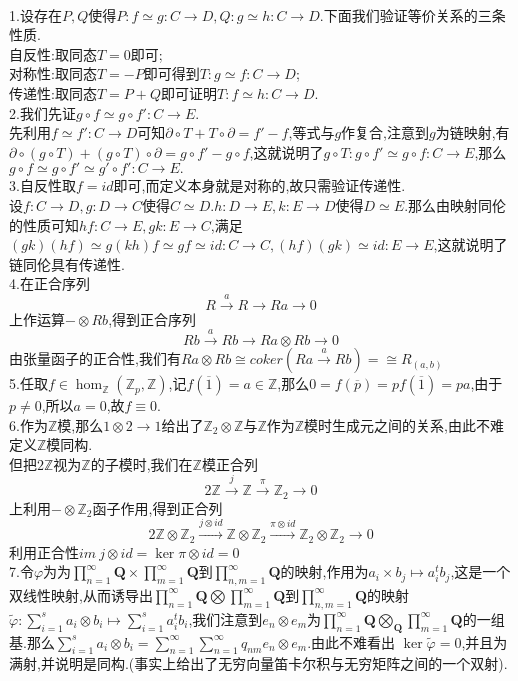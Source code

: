 \documentclass[a4paper]{ctexart}
\newcommand{\ts}[2]{#1\otimes #2}
\newcommand{\es}[5]{#1\xrightarrow{#2}#3\xrightarrow{#4}#5\xrightarrow{}0}
\begin{document}
\pagestyle{plain}
\noindent
{}
\\
1.设存在$P,Q$使得$P:f\simeq g:C\to D,Q:g\simeq h :C\to D$.下面我们验证等价关系的三条性质.\\
自反性:取同态$T=0$即可;\\
对称性:取同态$T=-P$即可得到$T:g\simeq f:C\to D$;\\
传递性:取同态$T=P+Q$即可证明$T:f\simeq h:C\to D$.\\
2.我们先证$g\circ f\simeq g\circ f':C\to E$.\\
先利用$f\simeq f':C\to D$可知$\partial \circ T+T\circ\partial=f'-f$,等式与$g$作复合,注意到$g$为链映射,有$\partial \circ (g\circ T)+(g\circ T)\circ\partial=g\circ f'-g\circ f$,这就说明了$g\circ T:g\circ f'\simeq g\circ f:C\to E$,那么$g\circ f\simeq g\circ f'\simeq g'\circ f':C\to E.$\\
3.自反性取$f=id$即可,而定义本身就是对称的,故只需验证传递性.\\
设$f:C\to D,g: D\to C$使得$C\simeq D$.$h:D\to E,k:E\to D$使得$D\simeq E$.那么由映射同伦的性质可知$hf:C\to E,gk:E\to C$,满足$(gk)(hf)\simeq g(kh)f\simeq gf\simeq id:C\to C,(hf)(gk)\simeq id:E\to E$,这就说明了链同伦具有传递性.\\
4.在正合序列
\[\es{R}{a}{R}{}{Ra}\]
上作运算$-\otimes Rb$,得到正合序列
\[\es{Rb}{a}{Rb}{}{Ra\otimes Rb}\]
由张量函子的正合性,我们有$Ra\otimes Rb\cong coker(Ra\xrightarrow{a}Rb)=\cong R_{(a,b)}$\\
5.任取$f\in \hom_{\mathbb{Z}}(\mathbb{Z}_p,\mathbb{Z})$,记$f(\overline{1})=a\in \mathbb{Z}$,那么$0=f(\overline{p})=pf(\overline{1})=pa$,由于$p\neq 0$,所以$a=0$,故$f\equiv 0$.\\
6.作为$\mathbb{Z}$模,那么$1\otimes 2\to 1$给出了$\mathbb{Z}_2\otimes \mathbb{Z}$与$\mathbb{Z}$作为$\mathbb{Z}$模时生成元之间的关系,由此不难定义$\mathbb{Z}$模同构.\\
但把$2\mathbb{Z}$视为$\mathbb{Z}$的子模时,我们在$\mathbb{Z}$模正合列
\[\es{2\mathbb{Z}}{j}{\mathbb{Z}}{\pi}{\mathbb{Z}_2}\]
上利用$-\otimes \mathbb{Z}_2$函子作用,得到正合列
\[\es{2\mathbb{Z}\otimes \mathbb{Z}_2}{j\otimes id}{\mathbb{Z}\otimes\mathbb{Z}_2}{\pi\otimes id}{\mathbb{Z}_2\otimes \mathbb{Z}_2}\]
利用正合性$im~j\otimes id=\ker \pi\otimes id=0$\\
7.令$\varphi$为为$\prod\limits_{n=1}^\infty \mathbf{Q}\times\prod\limits_{m=1}^\infty \mathbf{Q}$到$\prod\limits_{n,m=1}^\infty \mathbf{Q}$的映射,作用为$a_i\times b_j\mapsto a_i^tb_j$,这是一个双线性映射,从而诱导出$\prod\limits_{n=1}^\infty \mathbf{Q}\bigotimes\prod\limits_{m=1}^\infty \mathbf{Q}$到$\prod\limits_{n,m=1}^\infty \mathbf{Q}$的映射$\tilde{\varphi}:\sum\limits_{i=1}^s\ts{a_i}{b_i}\mapsto \sum\limits_{i=1}^sa_i^tb_i$,我们注意到$\ts{e_n}{e_m}$为$\prod\limits_{n=1}^\infty \mathbf{Q}\bigotimes_{\mathbf{Q}}\prod\limits_{m=1}^\infty \mathbf{Q}$的一组基.那么$\sum\limits_{i=1}^s\ts{a_i}{b_i}=\sum\limits_{n=1}^\infty\sum\limits_{n=1}^\infty q_{nm}\ts{e_n}{e_m}$.由此不难看出
$\ker\tilde{\varphi}=0$,并且为满射,并说明是同构.(事实上给出了无穷向量笛卡尔积与无穷矩阵之间的一个双射).
\end{document}
